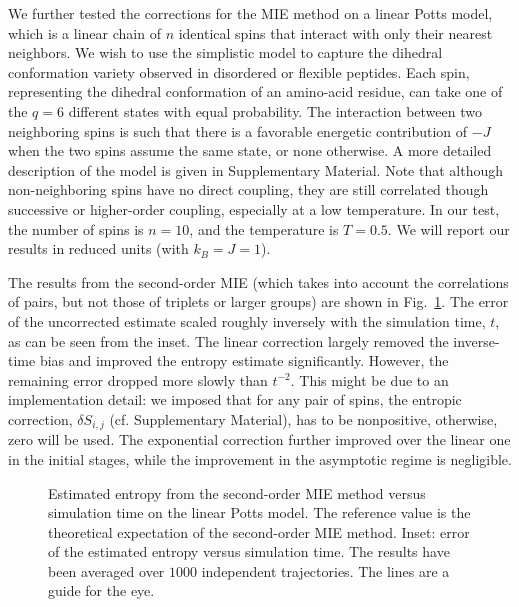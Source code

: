 \documentclass[reprint, superscriptaddress]{revtex4-1}
\begin{document}
We further tested the corrections for the MIE method
on a linear Potts model,
which is a linear chain of $n$ identical spins
that interact with only their nearest neighbors.
%
We wish to use the simplistic model
to capture the dihedral conformation variety
observed in disordered or flexible peptides.\cite{drake2018}
%
Each spin, representing the dihedral conformation of an amino-acid residue,
can take one of the $q = 6$ different states with equal probability.
%
The interaction between two neighboring spins
is such that there is a favorable energetic contribution of $-J$
when the two spins assume the same state, or none otherwise.
%
A more detailed description of the model is given in
Supplementary Material.
%
Note that although non-neighboring spins have no direct coupling,
they are still correlated though successive or higher-order coupling,
especially at a low temperature.
%
In our test, the number of spins is $n=10$,
and the temperature is $T = 0.5$.
%
We will report our results in reduced units (with $k_B = J = 1$).


The results from the second-order MIE
(which takes into account the correlations of pairs,
but not those of triplets or larger groups)
are shown in Fig.~\ref{fig:potts_mie2nd}.
%
The error of the uncorrected estimate
scaled roughly inversely with the simulation time, $t$,
as can be seen from the inset.
%
The linear correction largely removed the inverse-time bias
and improved the entropy estimate significantly.
%
However, the remaining error dropped more slowly than $t^{-2}$.
%
This might be due to an implementation detail:
we imposed that for any pair of spins,
the entropic correction,
$\delta S_{i, j}$ (cf. Supplementary Material), %
has to be nonpositive,
otherwise, zero will be used.
%
The exponential correction further improved over
the linear one in the initial stages,
while the improvement in the asymptotic regime is negligible.
%

\begin{figure}[h]\centering
  \caption{
    \label{fig:potts_mie2nd}
    Estimated entropy from the second-order MIE method
    versus simulation time on the linear Potts model.
    The reference value is the theoretical expectation
    of the second-order MIE method.
    Inset: error of the estimated entropy
    versus simulation time.
    The results have been averaged over $1000$ independent trajectories.
    The lines are a guide for the eye.
  }
\end{figure}
\end{document}
